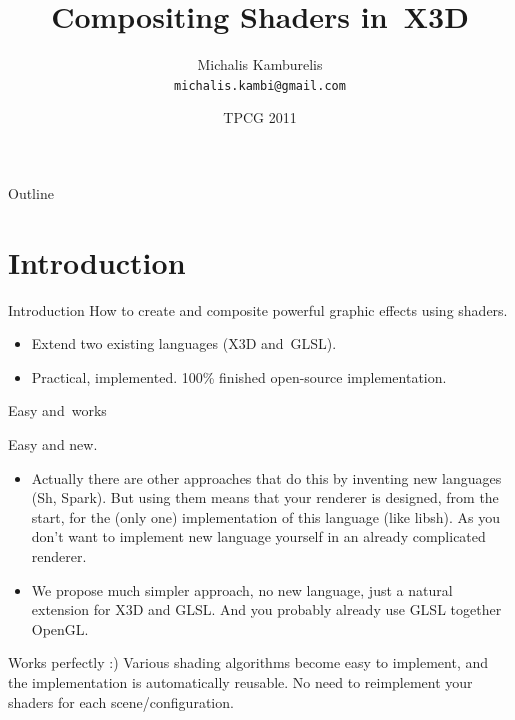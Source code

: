 \documentclass{beamer}
\title{Compositing Shaders in~X3D}
\author[Michalis Kamburelis]{Michalis Kamburelis \\ \texttt{michalis.kambi@gmail.com}}
\institute{Institute of Computer Science\\ University of Wroc{\l}aw, Poland}
\date{TPCG 2011}
\begin{document}
{

  \begin{frame}
    \titlepage
  \end{frame}
}

\begin{frame}{Outline}
  \tableofcontents
\end{frame}

\section{Introduction}

\begin{frame}{Introduction}
How to create and composite powerful graphic effects using shaders.

\begin{itemize}
  \item Extend two existing languages (X3D and~GLSL).
  \item Practical, implemented. 100\% finished open-source
    implementation.
\end{itemize}
\end{frame}

\begin{frame}{Easy and~works}

Easy and new.

\begin{itemize}
  \item Actually there are other approaches that do this by inventing
    new languages (Sh, Spark).
    But using them means that your renderer is designed, from the start,
    for the (only one) implementation of this language (like libsh).
    As you don't want to implement new language yourself in
    an already complicated renderer.

  \item We propose much simpler approach, no new language, just a natural
    extension for X3D and GLSL.
    And you probably already use GLSL together OpenGL.

\end{itemize}

Works perfectly :) Various shading algorithms become easy to implement,
and the implementation is automatically reusable.
No need to reimplement your shaders for each scene/configuration.


\end{frame}
\end{document}
